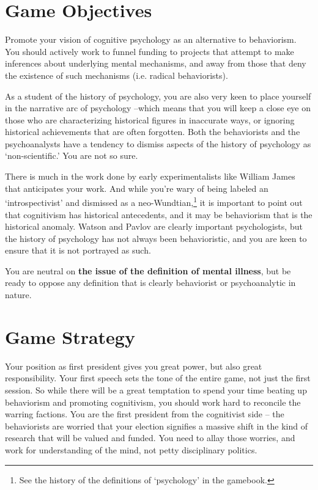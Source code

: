 \begin{refsection}
\section{Game Objectives}
\label{gameobjectives}

Promote your vision of cognitive psychology as an alternative to behaviorism. You should actively work to funnel funding to projects that attempt to make inferences about underlying mental mechanisms, and away from those that deny the existence of such mechanisms (i.e. radical behaviorists).

As a student of the history of psychology, you are also very keen to place yourself in the narrative arc of psychology –which means that you will keep a close eye on those who are characterizing historical figures in inaccurate ways, or ignoring historical achievements that are often forgotten. Both the behaviorists and the psychoanalysts have a tendency to dismiss aspects of the history of psychology as `non-scientific.' You are not so sure.

There is much in the work done by early experimentalists like William James that anticipates your work. And while you're wary of being labeled an `introspectivist' and dismissed as a neo-Wundtian,\footnote{See the history of the definitions of `psychology' in the gamebook.} it is important to point out that cognitivism has historical antecedents, and it may be behaviorism that is the historical anomaly. Watson and Pavlov are clearly important psychologists, but the history of psychology has not always been behavioristic, and you are keen to ensure that it is not portrayed as such.

You are neutral on \textbf{the issue of the definition of mental illness}, but be ready to oppose any definition that is clearly behaviorist or psychoanalytic in nature.

\section{Game Strategy}
\label{gamestrategy}

Your position as first president gives you great power, but also great responsibility. Your first speech sets the tone of the entire game, not just the first session. So while there will be a great temptation to spend your time beating up behaviorism and promoting cognitivism, you should work hard to reconcile the warring factions. You are the first president from the cognitivist side – the behaviorists are worried that your election signifies a massive shift in the kind of research that will be valued and funded. You need to allay those worries, and work for understanding of the mind, not petty disciplinary politics.


\end{refsection}
